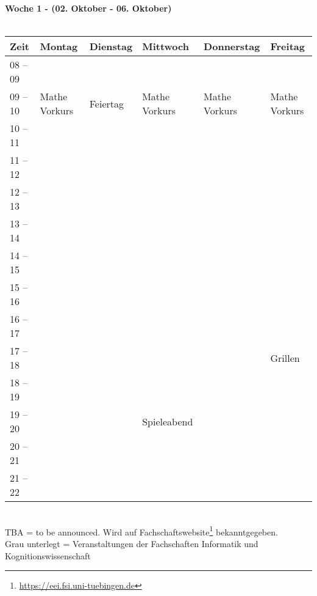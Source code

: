 \textbf{Woche 1 - (02. Oktober - 06. Oktober)}\\
\\
\begin{tabular}{|l|p{}|p{}|p{}|p{}|p{}|} \hline
 Zeit & Montag & Dienstag & Mittwoch & Donnerstag & Freitag \\ 
 \hline \hline
 08 -- 09 & & & & & \\ \cline{1-1} 
\cline{2-6}
 09 -- 10 &\footnotesize{Mathe Vorkurs} & \footnotesize{Feiertag} &\footnotesize{Mathe Vorkurs} & \footnotesize{Mathe Vorkurs} & \footnotesize{Mathe Vorkurs} \\ \cline{1-1}
 10 -- 11 & & & & & \\ \cline{1-1}
 11 -- 12 & & & & & \\ \cline{1-1}
 12 -- 13 & & & & & \\ \cline{1-1} 
 13 -- 14 & & & & & \\ \cline{1-1}
 14 -- 15 & & & & & \\ \cline{1-1}
 15 -- 16 & & & & & \\ \cline{1-2}\cline{4-6}
 16 -- 17 & & & & & \\ \cline{1-1}
 17 -- 18 & & & & &  \cellcolor{lightlightgray} \footnotesize{Grillen}\\ \cline{1-1} \cline{6-6}	
 18 -- 19 & & & & & \cellcolor{lightlightgray} \\ \cline{1-1}
 19 -- 20 & & &\cellcolor{lightlightgray} \footnotesize{Spieleabend} & & \cellcolor{lightlightgray}   \\ \cline{1-1}
 20 -- 21 & & &\cellcolor{lightlightgray} & &\cellcolor{lightlightgray}  \\ \cline{1-1}
 21 -- 22 & & &\cellcolor{lightlightgray} & & \cellcolor{lightlightgray}\\ \hline
 \end{tabular}
\\
{\scriptsize TBA = to be announced. Wird auf Fachschaftswebsite\footnote{\url{https://eei.fsi.uni-tuebingen.de}}  bekanntgegeben.} \\
{\scriptsize Grau unterlegt = Veranstaltungen der Fachschaften Informatik und Kognitionswissenschaft }
\vfill

